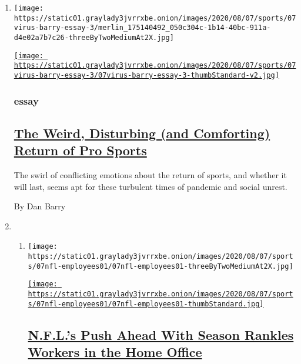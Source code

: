 \begin{enumerate}
\def\labelenumi{\arabic{enumi}.}
\item
  \texttt{[image: https://static01.graylady3jvrrxbe.onion/images/2020/08/07/sports/07virus-barry-essay-3/merlin\_175140492\_050c304c-1b14-40bc-911a-d4e02a7b7c26-threeByTwoMediumAt2X.jpg]}

  \href{/2020/08/07/sports/coronavirus-restart-nba-baseball.html}{\texttt{[image: https://static01.graylady3jvrrxbe.onion/images/2020/08/07/sports/07virus-barry-essay-3/07virus-barry-essay-3-thumbStandard-v2.jpg]}}

  \hypertarget{essay}{%
  \subsubsection{essay}\label{essay}}

  \hypertarget{the-weird-disturbing-and-comforting-return-of-pro-sports}{%
  \subsection{\texorpdfstring{\href{/2020/08/07/sports/coronavirus-restart-nba-baseball.html}{The
  Weird, Disturbing (and Comforting) Return of Pro
  Sports}}{The Weird, Disturbing (and Comforting) Return of Pro Sports}}\label{the-weird-disturbing-and-comforting-return-of-pro-sports}}

  The swirl of conflicting emotions about the return of sports, and
  whether it will last, seems apt for these turbulent times of pandemic
  and social unrest.

  By Dan Barry
\item
  \begin{enumerate}
  \def\labelenumii{\arabic{enumii}.}
  \item
    \texttt{[image: https://static01.graylady3jvrrxbe.onion/images/2020/08/07/sports/07nfl-employees01/07nfl-employees01-threeByTwoMediumAt2X.jpg]}

    \href{/2020/08/07/sports/football/coronavirus-nfl-restart-season.html}{\texttt{[image: https://static01.graylady3jvrrxbe.onion/images/2020/08/07/sports/07nfl-employees01/07nfl-employees01-thumbStandard.jpg]}}

    \hypertarget{nfls-push-ahead-with-season-rankles-workers-in-the-home-office}{%
    \subsection{\texorpdfstring{\href{/2020/08/07/sports/football/coronavirus-nfl-restart-season.html}{N.F.L.'s
    Push Ahead With Season Rankles Workers in the Home
    Office}}{N.F.L.'s Push Ahead With Season Rankles Workers in the Home Office}}\label{nfls-push-ahead-with-season-rankles-workers-in-the-home-office}}


\end{enumerate}
\end{enumerate}
